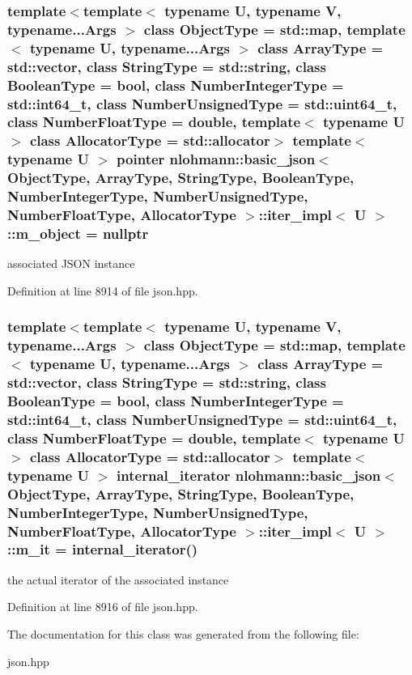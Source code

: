 \subsubsection[{m\+\_\+object}]{\setlength{\rightskip}{0pt plus 5cm}template$<$template$<$ typename U, typename V, typename...\+Args $>$ class Object\+Type = std\+::map, template$<$ typename U, typename...\+Args $>$ class Array\+Type = std\+::vector, class String\+Type  = std\+::string, class Boolean\+Type  = bool, class Number\+Integer\+Type  = std\+::int64\+\_\+t, class Number\+Unsigned\+Type  = std\+::uint64\+\_\+t, class Number\+Float\+Type  = double, template$<$ typename U $>$ class Allocator\+Type = std\+::allocator$>$ template$<$typename U $>$ {\bf pointer} {\bf nlohmann\+::basic\+\_\+json}$<$ Object\+Type, Array\+Type, String\+Type, Boolean\+Type, Number\+Integer\+Type, Number\+Unsigned\+Type, Number\+Float\+Type, Allocator\+Type $>$\+::{\bf iter\+\_\+impl}$<$ U $>$\+::m\+\_\+object = nullptr\hspace{0.3cm}{\ttfamily [private]}}\label{classnlohmann_1_1basic__json_1_1iter__impl_a1c6303265483322388cbd033ddf53f72}


associated J\+S\+O\+N instance 



Definition at line 8914 of file json.\+hpp.

\hypertarget{classnlohmann_1_1basic__json_1_1iter__impl_a22ffccd0f8f74669076118c3c374a29c}{}
\subsubsection[{m\+\_\+it}]{\setlength{\rightskip}{0pt plus 5cm}template$<$template$<$ typename U, typename V, typename...\+Args $>$ class Object\+Type = std\+::map, template$<$ typename U, typename...\+Args $>$ class Array\+Type = std\+::vector, class String\+Type  = std\+::string, class Boolean\+Type  = bool, class Number\+Integer\+Type  = std\+::int64\+\_\+t, class Number\+Unsigned\+Type  = std\+::uint64\+\_\+t, class Number\+Float\+Type  = double, template$<$ typename U $>$ class Allocator\+Type = std\+::allocator$>$ template$<$typename U $>$ {\bf internal\+\_\+iterator} {\bf nlohmann\+::basic\+\_\+json}$<$ Object\+Type, Array\+Type, String\+Type, Boolean\+Type, Number\+Integer\+Type, Number\+Unsigned\+Type, Number\+Float\+Type, Allocator\+Type $>$\+::{\bf iter\+\_\+impl}$<$ U $>$\+::m\+\_\+it = {\bf internal\+\_\+iterator}()\hspace{0.3cm}{\ttfamily [private]}}\label{classnlohmann_1_1basic__json_1_1iter__impl_a22ffccd0f8f74669076118c3c374a29c}


the actual iterator of the associated instance 



Definition at line 8916 of file json.\+hpp.



The documentation for this class was generated from the following file\+:\begin{DoxyCompactItemize}
\item 
json.\+hpp\end{DoxyCompactItemize}
